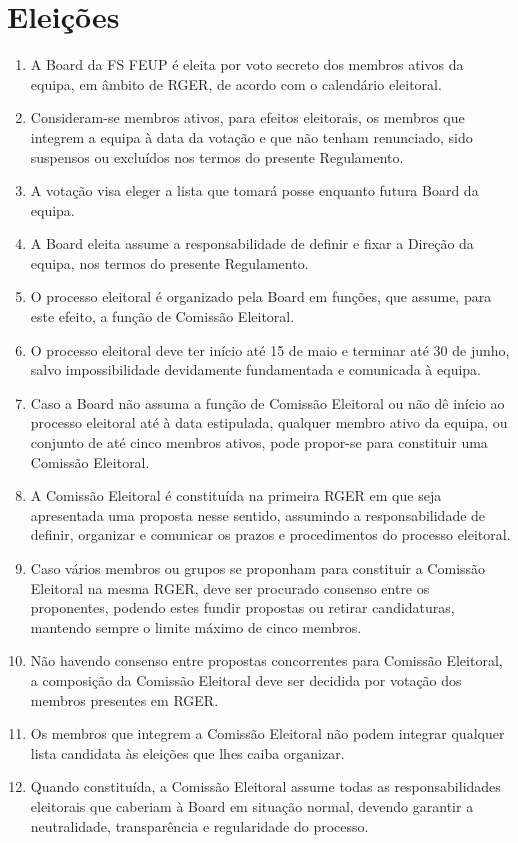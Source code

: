\section{Eleições}
\begin{enumerate}
  \item A Board da FS FEUP é eleita por voto secreto dos membros ativos da equipa, em âmbito de RGER, de acordo com o calendário eleitoral.
  \item Consideram-se membros ativos, para efeitos eleitorais, os membros que integrem a equipa à data da votação e que não tenham renunciado, sido suspensos ou excluídos nos termos do presente Regulamento.
  \item A votação visa eleger a lista que tomará posse enquanto futura Board da equipa.
  \item A Board eleita assume a responsabilidade de definir e fixar a Direção da equipa, nos termos do presente Regulamento.
  \item O processo eleitoral é organizado pela Board em funções, que assume, para este efeito, a função de Comissão Eleitoral.
  \item O processo eleitoral deve ter início até 15 de maio e terminar até 30 de junho, salvo impossibilidade devidamente fundamentada e comunicada à equipa.
  \item Caso a Board não assuma a função de Comissão Eleitoral ou não dê início ao processo eleitoral até à data estipulada, qualquer membro ativo da equipa, ou conjunto de até cinco membros ativos, pode propor-se para constituir uma Comissão Eleitoral.
  \item A Comissão Eleitoral é constituída na primeira RGER em que seja apresentada uma proposta nesse sentido, assumindo a responsabilidade de definir, organizar e comunicar os prazos e procedimentos do processo eleitoral.
  \item Caso vários membros ou grupos se proponham para constituir a Comissão Eleitoral na mesma RGER, deve ser procurado consenso entre os proponentes, podendo estes fundir propostas ou retirar candidaturas, mantendo sempre o limite máximo de cinco membros.
  \item Não havendo consenso entre propostas concorrentes para Comissão Eleitoral, a composição da Comissão Eleitoral deve ser decidida por votação dos membros presentes em RGER.
  \item Os membros que integrem a Comissão Eleitoral não podem integrar qualquer lista candidata às eleições que lhes caiba organizar.
  \item Quando constituída, a Comissão Eleitoral assume todas as responsabilidades eleitorais que caberiam à Board em situação normal, devendo garantir a neutralidade, transparência e regularidade do processo.

\end{enumerate}
